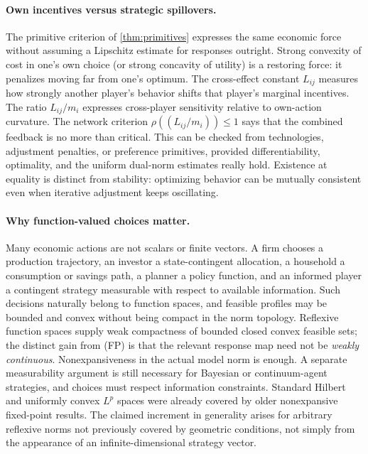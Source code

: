 \documentclass[11pt]{article}
\theoremstyle{definition}\newtheorem{definition}[theorem]{Definition}
\begin{document}
\paragraph{Own incentives versus strategic spillovers.}
The primitive criterion of \cref{thm:primitives} expresses the same economic force without assuming a Lipschitz estimate for responses outright. Strong convexity of cost in one's own choice (or strong concavity of utility) is a restoring force: it penalizes moving far from one's optimum. The cross-effect constant $L_{ij}$ measures how strongly another player's behavior shifts that player's marginal incentives. The ratio $L_{ij}/m_i$ expresses cross-player sensitivity relative to own-action curvature. The network criterion $\rho((L_{ij}/m_i))\le1$ says that the combined feedback is no more than critical. This can be checked from technologies, adjustment penalties, or preference primitives, provided differentiability, optimality, and the uniform dual-norm estimates really hold. Existence at equality is distinct from stability: optimizing behavior can be mutually consistent even when iterative adjustment keeps oscillating.

\paragraph{Why function-valued choices matter.}
Many economic actions are not scalars or finite vectors. A firm chooses a production trajectory, an investor a state-contingent allocation, a household a consumption or savings path, a planner a policy function, and an informed player a contingent strategy measurable with respect to available information. Such decisions naturally belong to function spaces, and feasible profiles may be bounded and convex without being compact in the norm topology. Reflexive function spaces supply weak compactness of bounded closed convex feasible sets; the distinct gain from (FP) is that the relevant response map need not be \emph{weakly continuous}. Nonexpansiveness in the actual model norm is enough. A separate measurability argument is still necessary for Bayesian or continuum-agent strategies, and choices must respect information constraints. Standard Hilbert and uniformly convex $L^p$ spaces were already covered by older nonexpansive fixed-point results. The claimed increment in generality arises for arbitrary reflexive norms not previously covered by geometric conditions, not simply from the appearance of an infinite-dimensional strategy vector.
\end{document}
